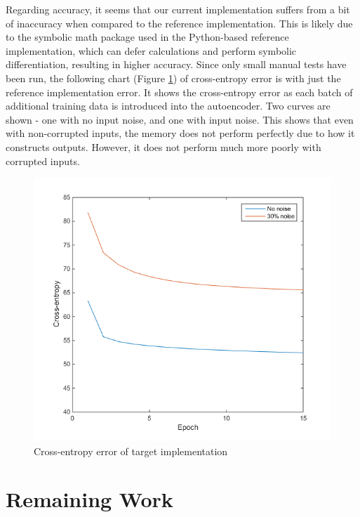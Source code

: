 \documentclass{sig-alternate}
\begin{document}
Regarding accuracy, it seems that our current implementation suffers from a bit of inaccuracy
when compared to the reference implementation. This is likely due to the symbolic math
package used in the Python-based reference implementation, which can defer calculations
and perform symbolic differentiation, resulting in higher accuracy. Since only
small manual tests have been run, the following chart (Figure \ref{fig:error}) of cross-entropy error is with just the
reference implementation error. It shows the cross-entropy error as each batch of additional
training data is introduced into the autoencoder. Two curves are shown - one with no input noise, 
and one with input noise. This shows that even with non-corrupted inputs, the memory does not perform
perfectly due to how it constructs outputs. However, it does not perform much more poorly with 
corrupted inputs. 

\begin{figure}[h]
	\begin{center}
		\includegraphics[width=1\linewidth]{error.png}
	\end{center}
	\vspace{-12pt}
    
	\caption{Cross-entropy error of target implementation}
	\label{fig:error}
\end{figure}

\section{Remaining Work}
\label{sec:project_proposal}
\end{document}
